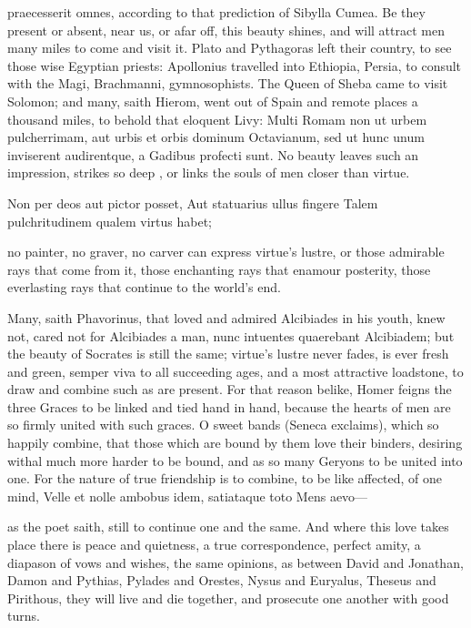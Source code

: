 {praecesserit omnes, according to that prediction of Sibylla
Cumea. Be they present or absent, near us, or afar off, this beauty
shines, and will attract men many miles to come and visit it. Plato and
Pythagoras left their country, to see those wise Egyptian priests:
Apollonius travelled into Ethiopia, Persia, to consult with the Magi,
Brachmanni, gymnosophists. The Queen of Sheba came to visit Solomon;
and many, saith Hierom, went out of Spain and remote places a
thousand miles, to behold that eloquent Livy: Multi Romam non ut
urbem pulcherrimam, aut urbis et orbis dominum Octavianum, sed ut hunc
unum inviserent audirentque, a Gadibus profecti sunt. No beauty leaves
such an impression, strikes so deep , or links the souls of men
closer than virtue.

Non per deos aut pictor posset,
Aut statuarius ullus fingere
Talem pulchritudinem qualem virtus habet;

no painter, no graver, no carver can express virtue's lustre, or those
admirable rays that come from it, those enchanting rays that enamour
posterity, those everlasting rays that continue to the world's end.

Many, saith Phavorinus, that loved and admired Alcibiades in his youth,
knew not, cared not for Alcibiades a man, nunc intuentes quaerebant
Alcibiadem; but the beauty of Socrates is still the same;
virtue's lustre never fades, is ever fresh and green, semper viva
to all succeeding ages, and a most attractive loadstone, to draw and
combine such as are present. For that reason belike, Homer feigns the
three Graces to be linked and tied hand in hand, because the hearts of
men are so firmly united with such graces. O sweet bands (Seneca
exclaims), which so happily combine, that those which are bound by them
love their binders, desiring withal much more harder to be bound, and
as so many Geryons to be united into one. For the nature of true
friendship is to combine, to be like affected, of one mind,
Velle et nolle ambobus idem, satiataque toto
Mens aevo---

as the poet saith, still to continue one and the same. And where this
love takes place there is peace and quietness, a true correspondence,
perfect amity, a diapason of vows and wishes, the same opinions, as
between  David and Jonathan, Damon and Pythias, Pylades and
Orestes, Nysus and Euryalus, Theseus and Pirithous, they
will live and die together, and prosecute one another with good turns.

}
